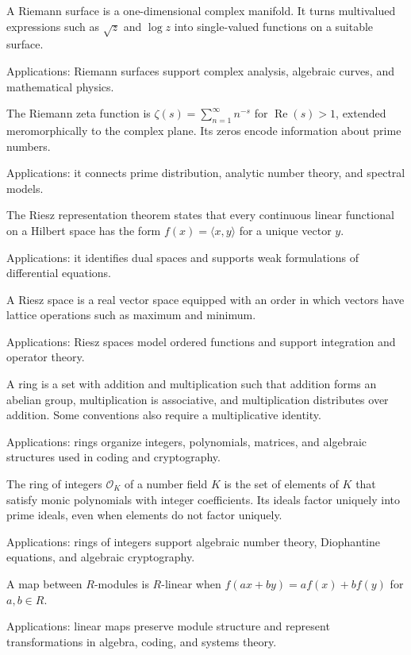 A Riemann surface is a one-dimensional complex manifold. It turns multivalued expressions such as $\sqrt z$ and $\log z$ into single-valued functions on a suitable surface. \par\noindent Applications: Riemann surfaces support complex analysis, algebraic curves, and mathematical physics.

The Riemann zeta function is $\zeta(s)=\sum_{n=1}^\infty n^{-s}$ for $\operatorname{Re}(s)>1$, extended meromorphically to the complex plane. Its zeros encode information about prime numbers. \par\noindent Applications: it connects prime distribution, analytic number theory, and spectral models.

The Riesz representation theorem states that every continuous linear functional on a Hilbert space has the form $f(x)=\langle x,y\rangle$ for a unique vector $y$. \par\noindent Applications: it identifies dual spaces and supports weak formulations of differential equations.

A Riesz space is a real vector space equipped with an order in which vectors have lattice operations such as maximum and minimum. \par\noindent Applications: Riesz spaces model ordered functions and support integration and operator theory.

A ring is a set with addition and multiplication such that addition forms an abelian group, multiplication is associative, and multiplication distributes over addition. Some conventions also require a multiplicative identity. \par\noindent Applications: rings organize integers, polynomials, matrices, and algebraic structures used in coding and cryptography.

The ring of integers $\mathcal O_K$ of a number field $K$ is the set of elements of $K$ that satisfy monic polynomials with integer coefficients. Its ideals factor uniquely into prime ideals, even when elements do not factor uniquely. \par\noindent Applications: rings of integers support algebraic number theory, Diophantine equations, and algebraic cryptography.

A map between $R$-modules is $R$-linear when $f(ax+by)=af(x)+bf(y)$ for $a,b\in R$. \par\noindent Applications: linear maps preserve module structure and represent transformations in algebra, coding, and systems theory.

